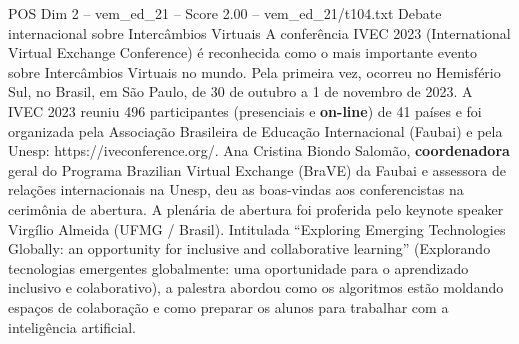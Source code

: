 \begin{textsample}{POS Dim 2 – vem\_ed\_21 – Score 2.00 – vem\_ed\_21/t104.txt}  \label{ex:f2_pos_170}
Debate internacional sobre Intercâmbios Virtuais A conferência IVEC 2023 (International Virtual Exchange Conference) é reconhecida como o mais importante evento sobre Intercâmbios Virtuais no mundo.
Pela primeira vez, ocorreu no Hemisfério Sul, no Brasil, em São Paulo, de 30 de outubro a 1 de novembro de 2023.
A IVEC 2023 reuniu 496 participantes (presenciais e \textbf{on-line}) de 41 países e foi organizada pela Associação Brasileira de Educação Internacional (Faubai) e pela Unesp: https://iveconference.org/.
Ana Cristina Biondo Salomão, \textbf{coordenadora} geral do Programa Brazilian Virtual Exchange (BraVE) da Faubai e assessora de relações internacionais na Unesp, deu as boas-vindas aos conferencistas na cerimônia de abertura.
A plenária de abertura foi proferida pelo keynote speaker Virgílio Almeida (UFMG / Brasil).
Intitulada “Exploring Emerging Technologies Globally: an opportunity for inclusive and collaborative learning” (Explorando tecnologias emergentes globalmente: uma oportunidade para o aprendizado inclusivo e colaborativo), a palestra abordou como os algoritmos estão moldando espaços de colaboração e como preparar os alunos para trabalhar com a inteligência artificial.

\end{textsample}
